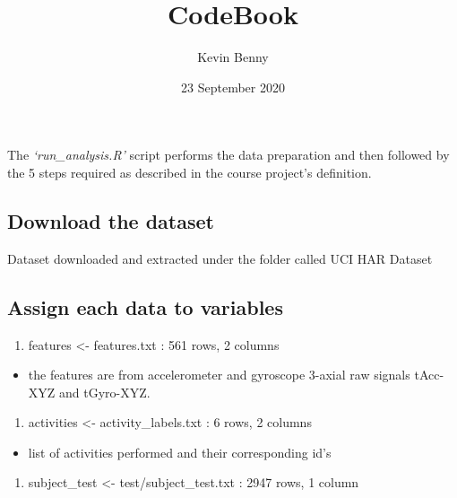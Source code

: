 \documentclass[
]{article}
\title{CodeBook}
\author{Kevin Benny}
\date{23 September 2020}
\providecommand{\tightlist}{%
  \setlength{\itemsep}{0pt}\setlength{\parskip}{0pt}}
\begin{document}
\maketitle

The \emph{`run\_analysis.R'} script performs the data preparation and
then followed by the 5 steps required as described in the course
project's definition.

\hypertarget{download-the-dataset}{%
\subsection{Download the dataset}\label{download-the-dataset}}

Dataset downloaded and extracted under the folder called UCI HAR Dataset

\hypertarget{assign-each-data-to-variables}{%
\subsection{Assign each data to
variables}\label{assign-each-data-to-variables}}

\begin{enumerate}
\def\labelenumi{\arabic{enumi}.}
\tightlist
\item
  features \textless- features.txt : 561 rows, 2 columns
\end{enumerate}

\begin{itemize}
\tightlist
\item
  the features are from accelerometer and gyroscope 3-axial raw signals
  tAcc-XYZ and tGyro-XYZ.
\end{itemize}

\begin{enumerate}
\def\labelenumi{\arabic{enumi}.}
\setcounter{enumi}{1}
\tightlist
\item
  activities \textless- activity\_labels.txt : 6 rows, 2 columns
\end{enumerate}

\begin{itemize}
\tightlist
\item
  list of activities performed and their corresponding id's
\end{itemize}

\begin{enumerate}
\def\labelenumi{\arabic{enumi}.}
\setcounter{enumi}{2}
\tightlist
\item
  subject\_test \textless- test/subject\_test.txt : 2947 rows, 1 column
\end{enumerate}
\end{document}
